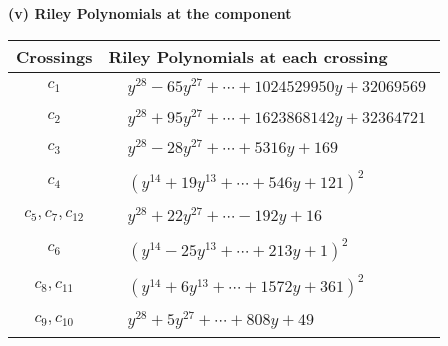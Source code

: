 \documentclass[1p]{elsarticle_modified}
\theoremstyle{definition}
\begin{document}
\newpage\renewcommand{\arraystretch}{1}
\flushleft \textbf{(v) Riley Polynomials at the component}\newline \\
\begin{tabular}{m{50pt}|m{274pt}}
Crossings & \hspace{64pt}Riley Polynomials at each crossing \\
\hline $$\begin{aligned}c_{1}\end{aligned}$$&$\begin{aligned}
&y^{28}-65 y^{27}+\cdots+1024529950 y+32069569
\end{aligned}$\\
\hline $$\begin{aligned}c_{2}\end{aligned}$$&$\begin{aligned}
&y^{28}+95 y^{27}+\cdots+1623868142 y+32364721
\end{aligned}$\\
\hline $$\begin{aligned}c_{3}\end{aligned}$$&$\begin{aligned}
&y^{28}-28 y^{27}+\cdots+5316 y+169
\end{aligned}$\\
\hline $$\begin{aligned}c_{4}\end{aligned}$$&$\begin{aligned}
&(y^{14}+19 y^{13}+\cdots+546 y+121)^{2}
\end{aligned}$\\
\hline $$\begin{aligned}c_{5},c_{7},c_{12}\end{aligned}$$&$\begin{aligned}
&y^{28}+22 y^{27}+\cdots-192 y+16
\end{aligned}$\\
\hline $$\begin{aligned}c_{6}\end{aligned}$$&$\begin{aligned}
&(y^{14}-25 y^{13}+\cdots+213 y+1)^{2}
\end{aligned}$\\
\hline $$\begin{aligned}c_{8},c_{11}\end{aligned}$$&$\begin{aligned}
&(y^{14}+6 y^{13}+\cdots+1572 y+361)^{2}
\end{aligned}$\\
\hline $$\begin{aligned}c_{9},c_{10}\end{aligned}$$&$\begin{aligned}
&y^{28}+5 y^{27}+\cdots+808 y+49
\end{aligned}$\\
\hline
\end{tabular}\\~\\
\end{document}
